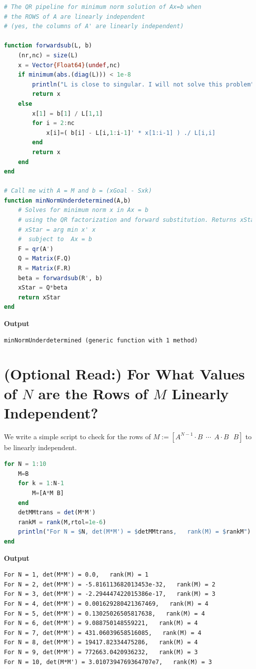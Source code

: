 \begin{lstlisting}[language=Julia,style=mystyle]
# The QR pipeline for minimum norm solution of Ax=b when
# the ROWS of A are linearly independent 
# (yes, the columns of A' are linearly independent)

function forwardsub(L, b)    
    (nr,nc) = size(L)
    x = Vector{Float64}(undef,nc)
    if minimum(abs.(diag(L))) < 1e-8
        println("L is close to singular. I will not solve this problem")
        return x
    else    
        x[1] = b[1] / L[1,1]
        for i = 2:nc
            x[i]=( b[i] - L[i,1:i-1]' * x[1:i-1] ) ./ L[i,i]
        end
        return x  
    end
end

# Call me with A = M and b = (xGoal - Sxk)
function minNormUnderdetermined(A,b)
    # Solves for minimum norm x in Ax = b 
    # using the QR factorization and forward substitution. Returns xStar.
    # xStar = arg min x' x
    #  subject to  Ax = b
    F = qr(A')
    Q = Matrix(F.Q)
    R = Matrix(F.R)
    beta = forwardsub(R', b) 
    xStar = Q*beta
    return xStar
end
\end{lstlisting}
\textbf{Output} 
\begin{verbatim}
minNormUnderdetermined (generic function with 1 method)
\end{verbatim}

\section{(Optional Read:) For What Values of $N$ are the Rows of $M$ Linearly Independent? }

We write a simple script to check for the rows of $M:=[A^{N-1}\cdot B~~ \cdots ~~A\cdot B~~~B]$ to be linearly independent.\\

\begin{lstlisting}[language=Julia,style=mystyle]
for N = 1:10
    M=B
    for k = 1:N-1
        M=[A*M B]
    end
    detMMtrans = det(M*M')
    rankM = rank(M,rtol=1e-6)
    println("For N = $N, det(M*M') = $detMMtrans,   rank(M) = $rankM")   
end
\end{lstlisting}
\textbf{Output} 
\begin{verbatim}
For N = 1, det(M*M') = 0.0,   rank(M) = 1
For N = 2, det(M*M') = -5.816113682013453e-32,   rank(M) = 2
For N = 3, det(M*M') = -2.294447422015386e-17,   rank(M) = 3
For N = 4, det(M*M') = 0.001629280421367469,   rank(M) = 4
For N = 5, det(M*M') = 0.13025026505817638,   rank(M) = 4
For N = 6, det(M*M') = 9.088750148559221,   rank(M) = 4
For N = 7, det(M*M') = 431.06039658516085,   rank(M) = 4
For N = 8, det(M*M') = 19417.82334475286,   rank(M) = 4
For N = 9, det(M*M') = 772663.0420936232,   rank(M) = 3
For N = 10, det(M*M') = 3.0107394769364707e7,   rank(M) = 3
\end{verbatim}

